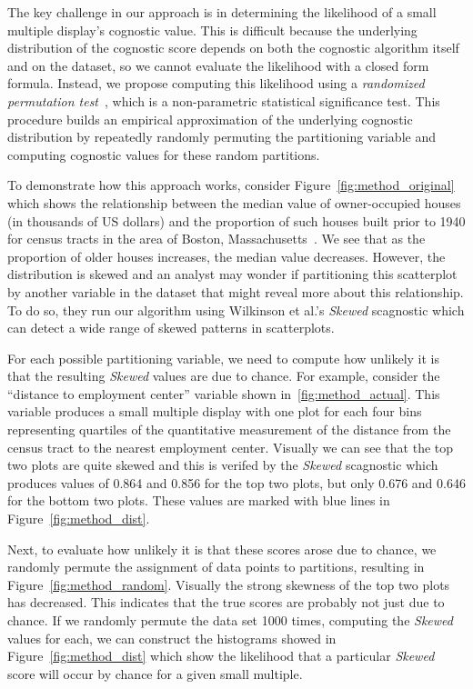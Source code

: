 The key challenge in our approach is in determining the likelihood of a small multiple display's cognostic value. This is difficult because the underlying distribution of the cognostic score depends on both the cognostic algorithm itself and on the dataset, so we cannot evaluate the likelihood with a closed form formula. Instead, we propose computing this likelihood using a \emph{randomized permutation test}~\cite{Good2000}, which is a non-parametric statistical significance test. This procedure builds an empirical approximation of the underlying cognostic distribution by repeatedly randomly permuting the partitioning variable and computing cognostic values for these random partitions.

To demonstrate how this approach works, consider
Figure~\ref{fig:method_original} which shows the relationship between the median value of owner-occupied houses (in thousands of US dollars) and the proportion of such houses built prior to 1940 for census tracts in the area of Boston, Massachusetts~\cite{Harrison1978}. We see that as the proportion of older houses increases, the median value decreases. However, the distribution is skewed and an analyst may wonder if partitioning this scatterplot by another variable in the dataset that might reveal more about this relationship.
To do so, they run our algorithm using Wilkinson et al.'s \emph{Skewed} scagnostic which can detect a wide range of skewed patterns in scatterplots.

For each possible partitioning variable, we need to compute how unlikely it is that the resulting \emph{Skewed} values are due to chance. For example, consider the ``distance to employment center'' variable shown in~\ref{fig:method_actual}. This variable produces a small multiple display with one plot for each four bins representing quartiles of the quantitative measurement of the distance from the census tract to the nearest employment center. Visually we can see that the top two plots are quite skewed and this is verifed by the \emph{Skewed} scagnostic which produces values of 0.864 and 0.856 for the top two plots, but only 0.676 and 0.646 for the bottom two plots. These values are marked with blue lines in  Figure~\ref{fig:method_dist}.

Next, to evaluate how unlikely it is that these scores arose due to chance, we randomly permute the assignment of data points to partitions, resulting in Figure~\ref{fig:method_random}. Visually the strong skewness of the top two plots has decreased. This indicates that the true scores are probably not just due to chance. If we randomly permute the data set 1000 times, computing the \emph{Skewed} values for each, we can construct the histograms showed in Figure~\ref{fig:method_dist} which show the likelihood that a particular \emph{Skewed} score will occur by chance for a given small multiple.

